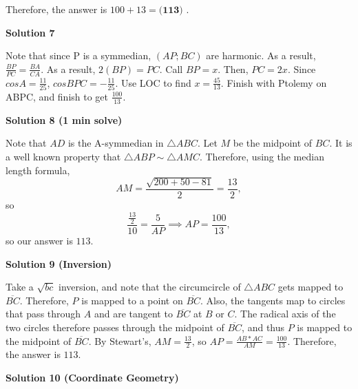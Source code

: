 \begin{enumerate}
 
Therefore, the answer is $100 + 13 = \boxed{\textbf{(113) }}$.

 



\textbf{Solution 7}

Note that since P is a symmedian, $(AP;BC)$ are harmonic. As a result, $\frac{BP}{PC} = \frac{BA}{CA}$. As a result, $2(BP) = PC$. Call $BP = x$. Then, $PC = 2x$. Since $cos A = \frac{11}{25}$, $cos BPC = - \frac{11}{25}$. Use LOC to find $x = \frac{45}{13}$. Finish with Ptolemy on ABPC, and finish to get $\frac{100}{13}$.

 



\textbf{Solution 8 (1 min solve)}

Note that $AD$ is the A-symmedian in $\triangle ABC$. Let $M$ be the midpoint of $BC$. It is a well known property that $\triangle ABP \sim \triangle AMC$. Therefore, using the median length formula, 
 \[AM = \frac{\sqrt{200+50-81}}{2} = \frac{13}{2},\]so 
 \[\frac{\frac{13}{2}}{10} = \frac{5}{AP} \implies AP = \frac{100}{13},\]so our answer is $\boxed{113}$.

 



\textbf{Solution 9 (Inversion)}

Take a $\sqrt{bc}$ inversion, and note that the circumcircle of $\triangle ABC$ gets mapped to $\overline{BC}$. Therefore, $P$ is mapped to a point on $\overline{BC}$. Also, the tangents map to circles that pass through $A$ and are tangent to $\overline{BC}$ at $B$ or $C$. The radical axis of the two circles therefore passes through the midpoint of $\overline{BC}$, and thus $P$ is mapped to the midpoint of $\overline{BC}$. By Stewart's, $AM=\frac{13}{2}$, so $AP=\frac{AB*AC}{AM}=\frac{100}{13}$. Therefore, the answer is $\boxed{113}$. 

 



\textbf{Solution 10 (Coordinate Geometry)}


\end{enumerate}
